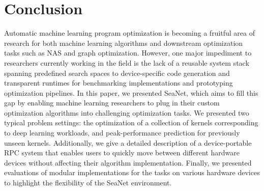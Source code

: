 \section{Conclusion}
Automatic machine learning program optimization is becoming a fruitful area of research for both machine learning algorithms and downstream optimization tasks such as NAS and graph optimization.
However, one major impediment to researchers currently working in the field is the lack of a reusable system stack spanning predefined search spaces to device-specific code generation and transparent runtimes for benchmarking implementations and prototyping optimization pipelines.
In this paper, we presented SeaNet, which aims to fill this gap by enabling machine learning researchers to plug in their custom optimization algorithms into challenging optimization tasks.
We presented two typical problem settings: the optimization of a collection of kernels corresponding to deep learning workloads, and peak-performance prediction for previously unseen kernels.
Additionally, we give a detailed description of a device-portable RPC system that enables users to quickly move between different hardware devices without affecting their algorithm implementation.
Finally, we presented evaluations of modular implementations for the tasks on various hardware devices to highlight the flexibility of the SeaNet environment.



%
%
%
%

